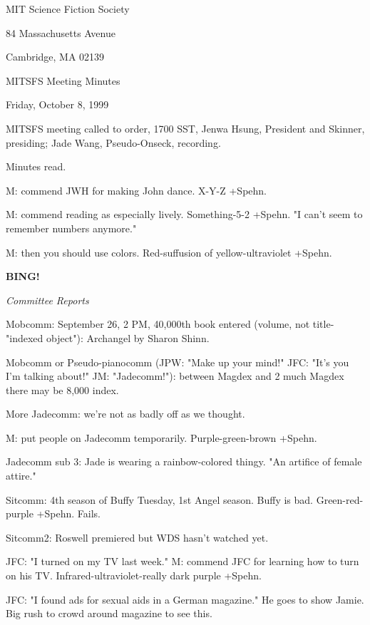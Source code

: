 \documentclass[12pt]{article}
\newcommand{\bing}{{\bf BING!} }
\newcommand{\goto}[1]{\bing \vskip 12pt \centerline{{\em{#1}}}}
\begin{document}
\begin{center}

MIT Science Fiction Society 

84 Massachusetts Avenue

Cambridge, MA 02139

\vspace{12pt}

MITSFS Meeting Minutes 

Friday, October 8, 1999

\end{center}
 
\vspace{18pt}

\setlength{\parskip}{6pt}

\noindent
MITSFS meeting called to order, 1700 SST,
Jenwa Hsung, President and Skinner, presiding; Jade Wang, Pseudo-Onseck, recording.

Minutes read.

M: commend JWH for making John dance. X-Y-Z +Spehn.

M: commend reading as especially lively. Something-5-2 +Spehn. "I can't seem to remember numbers anymore."

M: then you should use colors. Red-suffusion of yellow-ultraviolet +Spehn.

\goto{Committee Reports}

Mobcomm: September 26, 2 PM, 40,000th book entered (volume, not title- "indexed object"): Archangel by Sharon Shinn.

Mobcomm or Pseudo-pianocomm (JPW: "Make up your mind!" JFC: "It's you I'm talking about!" JM: "Jadecomm!"): between Magdex and 2 much Magdex there may be 8,000 index.

More Jadecomm: we're not as badly off as we thought.

M: put people on Jadecomm temporarily. Purple-green-brown +Spehn.

Jadecomm sub 3: Jade is wearing a rainbow-colored thingy. "An artifice of female attire."

Sitcomm: 4th season of Buffy Tuesday, 1st Angel season. Buffy is bad. Green-red-purple +Spehn. Fails.

Sitcomm2: Roswell premiered but WDS hasn't watched yet.

JFC: "I turned on my TV last week." M: commend JFC for learning how to turn on his TV. Infrared-ultraviolet-really dark purple +Spehn.

JFC: "I found ads for sexual aids in a German magazine." He goes to show Jamie. Big rush to crowd around magazine to see this.
\end{document}

